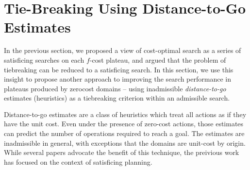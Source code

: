 \clearpage
\section{Tie-Breaking Using Distance-to-Go Estimates}

\label{sec:distance-to-go}
In the previous section, we proposed a view of cost-optimal search as a series of satisficing searches on each $f$-cost plateau, and argued that 
the problem of tiebreaking can be reduced to a satisficing search.
In this section, we use this insight to propose another approach to improving the
search performance in plateaus produced by zerocost domains --
using inadmissible \emph{distance-to-go} estimates (heuristics) as a tiebreaking criterion within an admissible \astar search.



Distance-to-go estimates are a class of
heuristics which treat all actions as if they have the unit cost. Even under
the presence of zero-cost actions, those estimates can predict the
number of operations required to reach a goal.
The estimates are inadmissible in general, with exceptions that the domains are unit-cost by origin.
While several papers advocate the benefit of this technique, the preivious work has focused on 
the context of satisficing planning.

